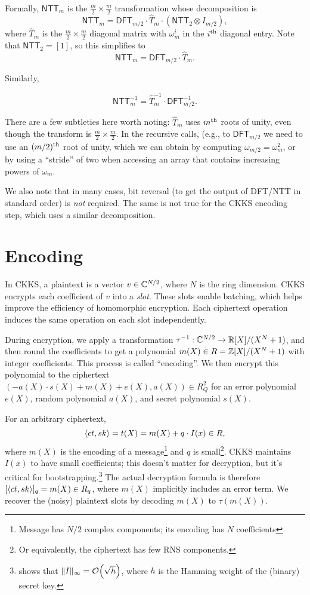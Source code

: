 \documentclass[../fheimpl.tex]{subfiles}
\begin{document}
Formally, $\mathsf{NTT}_m$ is the $\frac{m}{2}\times\frac{m}{2}$ transformation whose decomposition is
\[\mathsf{NTT}_m = \mathsf{DFT}_{m/2}\cdot \hat{T}_m\cdot (\mathsf{NTT}_2\otimes I_{m/2}),\]
where $\hat{T}_m$ is the $\frac{m}{2}\times\frac{m}{2}$ diagonal matrix with $\omega_m^i$ in the $i^{\mathrm{th}}$ diagonal entry.
Note that $\mathsf{NTT}_2 = [1]$, so this simplifies to 
\[\mathsf{NTT}_m = \mathsf{DFT}_{m/2}\cdot \hat{T}_m.\]

Similarly,

\[\mathsf{NTT}_m^{-1} = \hat{T}_m^{-1}\cdot \mathsf{DFT}_{m/2}^{-1}.\]

There are a few subtleties here worth noting: $\hat{T}_m$ uses $m^{\mathrm{th}}$ roots of unity, even though the transform is $\frac{m}{2}\times\frac{m}{2}$. In the recursive calls, (e.g., to $\mathsf{DFT}_{m/2}$ we need to use an $(m/2)^{\mathrm{th}}$ root of unity, which we can obtain by computing $\omega_{m/2}=\omega_m^2$, or by using a ``stride'' of two when accessing an array that contains increasing powers of $\omega_m$.

We also note that in many cases, bit reversal (to get the output of DFT/NTT in standard order) is \emph{not} required. The same is not true for the CKKS encoding step, which uses a similar decomposition.

\section{Encoding}
\label{sec:ckksencoding}
    In CKKS, a plaintext is a vector $v\in \mathbb{C}^{N/2}$, where $N$ is the ring dimension. CKKS encrypts each coefficient of $v$ into a \emph{slot}. These slots enable batching, which helps improve the efficiency of homomorphic encryption. Each ciphertext operation induces the same operation on each slot independently.	
	
    During encryption, we apply a transformation $\tau^{-1}: \mathbb{C}^{N/2}\rightarrow \mathbb{R}[X]/(X^N+1)$, and then round the coefficients to get a polynomial $m(X)\in R=\mathbb{Z}[X]/(X^N+1)$ with integer coefficients. This process is called ``encoding''. We then encrypt this polynomial to the ciphertext $(-a(X)\cdot s(X) + m(X) + e(X), a(X))\in R_Q^2$ for an error polynomial $e(X)$, random polynomial $a(X)$, and secret polynomial $s(X)$.
	
    For an arbitrary ciphertext, 
    \[\langle ct, sk\rangle = t(X) = m(X)+q\cdot I(x)\in R,\]
    where $m(X)$ is the encoding of a message\footnote{Message has $N/2$ complex components; its encoding has $N$ coefficients} and $q$ is small\footnote{Or equivalently, the ciphertext has few RNS components.}. CKKS maintains $I(x)$ to have small coefficients; this doesn't matter for decryption, but it's critical for bootstrapping.\footnote{\label{footnote:sparsekey}\cite{cryptoeprint:2018/153} shows that $\length{I}_\infty = \mathcal{O}\parens*{\sqrt{h}}$, where $h$ is the Hamming weight of the (binary) secret key.} The actual decryption formula is therefore $[\langle ct, sk\rangle]_q = m(X)\in R_q$, where $m(X)$ implicitly includes an error term. We recover the (noisy) plaintext slots by decoding $m(X)$ to $\tau(m(X))$.
	
\end{document}
